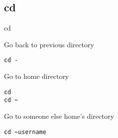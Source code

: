 \subsection{cd}

\begin{frame}[fragile]{cd}
  \begin{exampleblock}{Go back to previous directory}
    \begin{lstlisting}[showstringspaces=false]
cd -
    \end{lstlisting}
  \end{exampleblock}
  \pause

  \begin{exampleblock}{Go to home directory}
    \begin{lstlisting}[showstringspaces=false]
cd
cd ~
    \end{lstlisting}
  \end{exampleblock}
  \pause

  \begin{exampleblock}{Go to someone else home's directory}
    \begin{lstlisting}[showstringspaces=false]
cd ~username
    \end{lstlisting}
  \end{exampleblock}
\end{frame}
